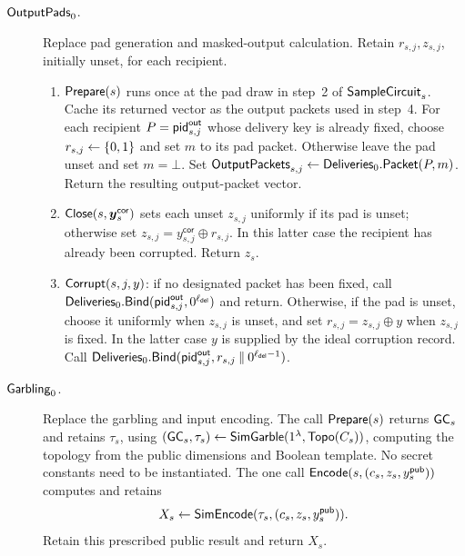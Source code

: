 \begin{description}
\item[$\mathsf{OutputPads}_0$.]\label{hook:output-pads}
 Replace pad generation and masked-output calculation.  Retain
 $r_{s,j},z_{s,j}$, initially unset, for each recipient.
 \begin{enumerate}
 \item $\mathsf{Prepare}(s)$ runs once at the pad draw in step~2 of
   $\mathsf{SampleCircuit}_s$.  Cache its returned vector as the output packets
   used in step~4.
   For each recipient $P=\mathsf{pid}^{\mathsf{out}}_{s,j}$ whose delivery
   key is already fixed, choose $r_{s,j}\mathrel{\leftarrow}\{0,1\}$ and set $m$ to
   its pad packet.  Otherwise leave the pad unset and set $m=\bot$.
   Set $\mathsf{OutputPackets}_{s,j}\gets\mathsf{Deliveries}_0.\mathsf{Packet}(P,m)$.
   Return the resulting output-packet vector.
 \item $\mathsf{Close}(s,\boldsymbol y^{\mathsf{cor}}_s)$ sets each unset
   $z_{s,j}$ uniformly if its pad is unset; otherwise set
   $z_{s,j}=y^{\mathsf{cor}}_{s,j}\oplus r_{s,j}$.
   In this latter case the recipient has already been corrupted.
   Return $z_s$.
 \item $\mathsf{Corrupt}(s,j,y)$: if no designated packet has been fixed,
   call $\mathsf{Deliveries}_0.\mathsf{Bind}(\mathsf{pid}^{\mathsf{out}}_{s,j},
   0^{\ell_{\mathsf{del}}})$ and return.  Otherwise, if the pad is unset,
   choose it uniformly when $z_{s,j}$ is unset, and set
   $r_{s,j}=z_{s,j}\oplus y$ when $z_{s,j}$ is fixed.  In the latter
   case $y$ is supplied by the ideal corruption record.  Call
   $\mathsf{Deliveries}_0.\mathsf{Bind}(\mathsf{pid}^{\mathsf{out}}_{s,j},
   r_{s,j}\mathbin\|0^{\ell_{\mathsf{del}}-1})$.
 \end{enumerate}

\item[$\mathsf{Garbling}_0$.]\label{hook:garbling}
 Replace the garbling and input encoding.
 The call $\mathsf{Prepare}(s)$ returns $\mathsf{GC}_s$ and retains $\tau_s$, using
 $(\mathsf{GC}_s,\tau_s)\mathrel{\leftarrow}\mathsf{SimGarble}(1^\lambda,\mathsf{Topo}(C_s))$,
 computing the topology from the public dimensions and Boolean template.
 No secret constants need to be instantiated.
 The one call $\mathsf{Encode}(s,(c_s,z_s,y^{\mathsf{pub}}_s))$ computes and retains
 \[
   X_s\mathrel{\leftarrow}\mathsf{SimEncode}(\tau_s,(c_s,z_s,y^{\mathsf{pub}}_s)).
 \]
 Retain this prescribed public result and return $X_s$.


\end{description}
